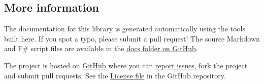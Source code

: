 \documentclass{article}
\begin{document}
\subsection*{More information}



The documentation for this library is generated automatically using the tools
built here. If you spot a typo, please submit a pull request! The source Markdown and F\# script files are
available in the \href{https://github.com/fsprojects/FSharp.Formatting/tree/master/docs}{docs folder on GitHub}.


The project is hosted on \href{https://github.com/fsprojects/FSharp.Formatting}{GitHub} where you can
\href{https://github.com/fsprojects/FSharp.Formatting/issues}{report issues}, fork the project and submit pull requests.
See the  \href{https://github.com/fsprojects/FSharp.Formatting/blob/master/LICENSE.md}{License file} in the GitHub repository.
\end{document}
